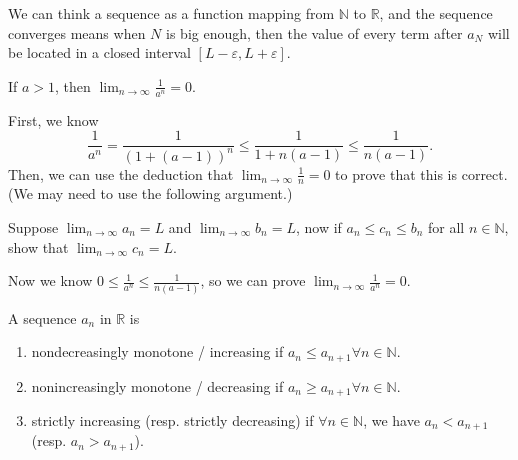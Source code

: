 \begin{prev}
    We can think a sequence as a function mapping from \(\mathbb{N} \) to \(\mathbb{R} \), and the sequence converges means when \(N\) is big enough, then the value of every term after \(a_N\) will be located in a closed interval \([L - \varepsilon , L + \varepsilon ]\).  
\end{prev}

\begin{eg}
    If \(a > 1\), then \(\lim_{n \to \infty} \frac{1}{a^n} = 0\).   
\end{eg}
\begin{explanation}
    First, we know 
    \[
        \frac{1}{a^n} = \frac{1}{\left( 1 + (a-1) \right)^n } \le \frac{1}{1+n(a-1)} \le \frac{1}{n(a-1)}.
    \]
    Then, we can use the deduction that \(\lim_{n \to \infty} \frac{1}{n} = 0 \) to prove that this is correct. (We may need to use the following argument.)
    \begin{exercise}
        Suppose \(\lim_{n \to \infty} a_n = L \) and \(\lim_{n \to \infty} b_n = L \), now if \(a_n \le c_n \le b_n\) for all \(n \in \mathbb{N} \), show that \(\lim_{n \to \infty} c_n = L \).     
    \end{exercise}
    Now we know \(0 \le \frac{1}{a^n} \le \frac{1}{n(a-1)}\), so we can prove \(\lim_{n \to \infty} \frac{1}{a^n} = 0 \).  
\end{explanation}

\begin{definition}
    A sequence \(a_n\) in \(\mathbb{R} \) is 
    \begin{enumerate}
        \item nondecreasingly monotone / increasing if \(a_n \le a_{n+1} \forall n \in \mathbb{N} \). 
        \item nonincreasingly monotone / decreasing if \(a_n \ge a_{n+1} \forall n \in \mathbb{N} \).
        \item strictly increasing (resp. strictly decreasing) if \(\forall n \in \mathbb{N} \), we have \(a_n < a_{n+1} \) (resp. \(a_n > a_{n+1} \)).   
    \end{enumerate}  
\end{definition}

